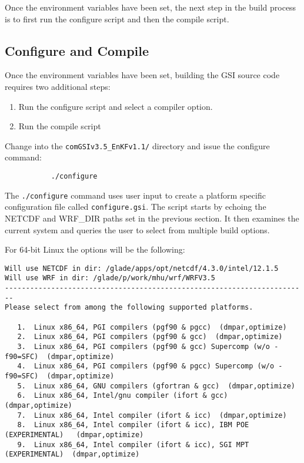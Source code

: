 Once the environment variables have been set, the next step in the build process is to first run the configure script and then the compile script.

\subsection{Configure and Compile} \label{ch2_compiling_configandcompile}

Once the environment variables have been set, building the GSI source code requires two additional steps:
\begin{enumerate}
\item Run the configure script and select a compiler option.
\item Run the compile script
\end{enumerate}
Change into the \verb|comGSIv3.5_EnKFv1.1/| directory and issue the configure command: 
\begin{verbatim}
           ./configure
\end{verbatim}
The \verb|./configure| command uses user input to create a platform specific configuration file called 
\verb|configure.gsi|. The script starts by echoing the NETCDF and WRF\_DIR paths set in the previous 
section. It then examines the current system and queries the user to select from multiple build options.

For 64-bit Linux the options will be the following:
\begin{scriptsize}
\begin{verbatim}
Will use NETCDF in dir: /glade/apps/opt/netcdf/4.3.0/intel/12.1.5
Will use WRF in dir: /glade/p/work/mhu/wrf/WRFV3.5
------------------------------------------------------------------------
Please select from among the following supported platforms.

   1.  Linux x86_64, PGI compilers (pgf90 & pgcc)  (dmpar,optimize)
   2.  Linux x86_64, PGI compilers (pgf90 & gcc)  (dmpar,optimize)
   3.  Linux x86_64, PGI compilers (pgf90 & gcc) Supercomp (w/o -f90=SFC)  (dmpar,optimize)
   4.  Linux x86_64, PGI compilers (pgf90 & pgcc) Supercomp (w/o -f90=SFC)  (dmpar,optimize)
   5.  Linux x86_64, GNU compilers (gfortran & gcc)  (dmpar,optimize)
   6.  Linux x86_64, Intel/gnu compiler (ifort & gcc)	 (dmpar,optimize)
   7.  Linux x86_64, Intel compiler (ifort & icc)  (dmpar,optimize)
   8.  Linux x86_64, Intel compiler (ifort & icc), IBM POE (EXPERIMENTAL)   (dmpar,optimize)
   9.  Linux x86_64, Intel compiler (ifort & icc), SGI MPT (EXPERIMENTAL)  (dmpar,optimize)
\end{verbatim}
\end{scriptsize}

